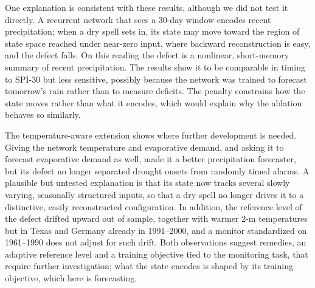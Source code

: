 \documentclass[pdflatex,sn-mathphys-ay]{sn-jnl}
\theoremstyle{thmstyletwo}
\begin{document}
One explanation is consistent with these results, although we did not test it directly. A recurrent
network that sees a 30-day window encodes recent precipitation; when a dry spell sets in, its state may
move toward the region of state space reached under near-zero input, where backward reconstruction is
easy, and the defect falls. On this reading the defect is a nonlinear, short-memory summary of recent
precipitation. The results show it to be comparable in timing to SPI-30 but less sensitive, possibly
because the network was trained to forecast tomorrow's rain rather than to measure deficits. The penalty
constrains how the state moves rather than what it encodes, which would explain why the ablation
behaves so similarly.

The temperature-aware extension shows where further development is needed. Giving the network
temperature and evaporative demand, and asking it to forecast evaporative demand as well, made it a
better precipitation forecaster, but its defect no longer separated drought onsets from randomly timed
alarms. A plausible but untested explanation is that its state now tracks several slowly varying,
seasonally structured inputs, so that a dry spell no longer drives it to a distinctive, easily
reconstructed configuration. In addition, the reference level of the defect drifted upward out of
sample, together with warmer 2-m temperatures but in Texas and Germany already in 1991--2000, and a
monitor standardized on 1961--1990 does not adjust for such drift. Both observations suggest remedies, an
adaptive reference level and a training objective tied to the monitoring task, that require further
investigation; what the state encodes is shaped by its training objective, which here is forecasting.
\end{document}
